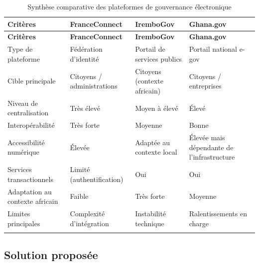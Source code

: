 \begin{longtable}{|p{3.5cm}|p{3.5cm}|p{3.5cm}|p{3.5cm}|}

\hline
\rowcolor{gray!30}
\textbf{Critères} & \textbf{FranceConnect} & \textbf{IremboGov} & \textbf{Ghana.gov} \\
\hline
\endfirsthead

\hline
\rowcolor{gray!30}
\textbf{Critères} & \textbf{FranceConnect} & \textbf{IremboGov} & \textbf{Ghana.gov} \\
\hline
\endhead

Type de plateforme & Fédération d’identité & Portail de services publics & Portail national e-gov \\
\hline

Cible principale & Citoyens / administrations & Citoyens (contexte africain) & Citoyens / entreprises \\
\hline

Niveau de centralisation & Très élevé & Moyen à élevé & Élevé \\
\hline

Interopérabilité & Très forte & Moyenne & Bonne \\
\hline

Accessibilité numérique & Élevée & Adaptée au contexte local & Élevée mais dépendante de l’infrastructure \\
\hline

Services transactionnels & Limité (authentification) & Oui & Oui \\
\hline

Adaptation au contexte africain & Faible & Très forte & Moyenne \\
\hline

Limites principales & Complexité d’intégration & Instabilité technique & Ralentissements en charge \\
\hline
\rowcolor{white}
\caption{Synthèse comparative des plateformes de gouvernance électronique}
\label{tab:benchmark_synthese}

\end{longtable}


















\subsection{Solution proposée}

